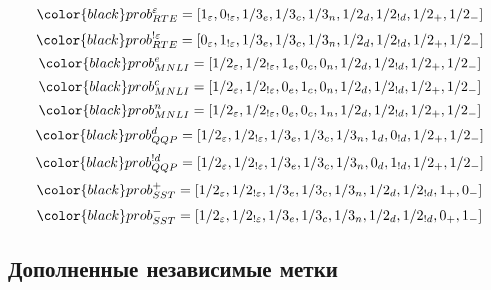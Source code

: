 \begin{equation}
\color{black} prob^{\varepsilon}_{RTE}  = [1_{\varepsilon}, 0_{!\varepsilon},1/3_{e},1/3_{c},1/3_{n},1/2_{d}, 1/2_{!d},1/2_{+},1/2_{-}]
\label{eq:ps2:0}
\end{equation}
\begin{equation}
\color{black} prob^{!\varepsilon}_{RTE} = [0_{\varepsilon}, 1_{!\varepsilon},1/3_{e},1/3_{c},1/3_{n},1/2_{d}, 1/2_{!d},1/2_{+},1/2_{-}]
\label{eq:ps2:1}
\end{equation}
\begin{equation}
\color{black} prob^{e}_{MNLI} = [1/2_{\varepsilon}, 1/2_{!\varepsilon},1_{e},0_{c},0_{n},1/2_{d}, 1/2_{!d},1/2_{+},1/2_{-}]
\label{eq:ps2:2}
\end{equation}
\begin{equation}
\color{black} prob^{c}_{MNLI} = [1/2_{\varepsilon}, 1/2_{!\varepsilon},0_{e},1_{c},0_{n},1/2_{d}, 1/2_{!d},1/2_{+},1/2_{-}]
\label{eq:ps2:3}
\end{equation}
\begin{equation}
\color{black} prob^{n}_{MNLI} = [1/2_{\varepsilon}, 1/2_{!\varepsilon},0_{e},0_{c},1_{n},1/2_{d}, 1/2_{!d},1/2_{+},1/2_{-}]
\label{eq:ps2:4}
\end{equation}
\begin{equation}
\color{black} prob^{d}_{QQP} = [1/2_{\varepsilon}, 1/2_{!\varepsilon},1/3_{e},1/3_{c},1/3_{n},1_{d}, 0_{!d},1/2_{+},1/2_{-}]
\label{eq:ps2:5}
\end{equation}
\begin{equation}
\color{black} prob^{!d}_{QQP} = [1/2_{\varepsilon}, 1/2_{!\varepsilon},1/3_{e},1/3_{c},1/3_{n},0_{d}, 1_{!d},1/2_{+},1/2_{-}]
\label{eq:ps2:6}
\end{equation}
\begin{equation}
\color{black} prob^{+}_{SST} = [1/2_{\varepsilon}, 1/2_{!\varepsilon},1/3_{e},1/3_{c},1/3_{n},1/2_{d}, 1/2_{!d},1_{+},0_{-}]
\label{eq:ps2:7}
\end{equation}
\begin{equation}
\color{black} prob^{-}_{SST} = [1/2_{\varepsilon}, 1/2_{!\varepsilon},1/3_{e},1/3_{c},1/3_{n},1/2_{d}, 1/2_{!d},0_{+},1_{-}]
\label{eq:ps2:8}
\end{equation}

\subsection{Дополненные независимые метки}\label{subch:pseudolabel/sect3/sub3}

